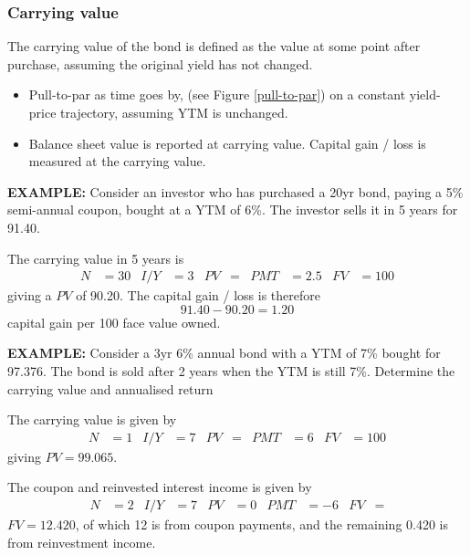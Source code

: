 \documentclass[../notes_compiled.tex]{subfiles}
\begin{document}
\subsubsection{Carrying value}
\begin{itemize}
\item The carrying value of the bond is defined as the value at some point after purchase, assuming the original yield has not changed. 
\begin{itemize}
\item Pull-to-par as time goes by, (see Figure \ref{pull-to-par}) on a constant yield-price trajectory, assuming YTM is unchanged.
\item Balance sheet value is reported at carrying value. Capital gain / loss is measured at the carrying value.
\end{itemize}
{\color{RedViolet}
\item[] \textbf{EXAMPLE:} Consider an investor who has purchased a 20yr bond, paying a 5\% semi-annual coupon, bought at a YTM of 6\%. The investor sells it in 5 years for 91.40.
}


{\color{RoyalBlue}
The carrying value in 5 years is 
\begin{align*}
N&=30  & I / Y &= 3 & PV &= & PMT &=2.5 & FV &=100
\end{align*}
giving a $PV$ of 90.20. The capital gain / loss is therefore
\begin{equation*}
91.40 - 90.20 = 1.20
\end{equation*}
capital gain per 100 face value owned.
\item[]
}


{\color{RedViolet}
\item[] \textbf{EXAMPLE:}  Consider a 3yr 6\% annual bond with a YTM of 7\% bought for 97.376. The bond is sold after 2 years when the YTM is still 7\%. Determine the carrying value and annualised return
}


{\color{RoyalBlue}
The carrying value is given by 
\begin{align*}
N&=1  & I / Y &= 7 & PV &= & PMT &=6 & FV &=100
\end{align*}
giving $PV=99.065$.

The coupon and reinvested interest income is given by
\begin{align*}
N&=2  & I / Y &= 7 & PV &=0 & PMT &=-6 & FV &=
\end{align*}
$FV=12.420$, of which 12 is from coupon payments, and the remaining 0.420 is from reinvestment income.

}
\end{itemize}
\end{document}
